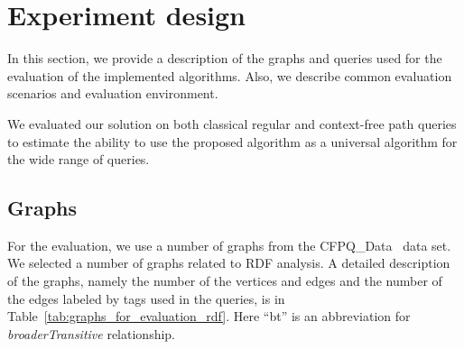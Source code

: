 \documentclass[
11pt,%
tightenlines,%
twoside,%
onecolumn,%
nobibnotes,%
nofootinbib,%
superscriptaddress,%
noshowpacs,%
longbibliography,%
centertags]%
{revtex4-2}
\begin{document}




\section{Experiment design}\label{section:dataset}
In this section, we provide a description of the graphs and queries used for the evaluation of the implemented algorithms. Also, we describe common evaluation scenarios and evaluation environment.

We evaluated our solution on both classical regular and context-free path queries to estimate the ability to use the proposed algorithm as a universal algorithm for the wide range of queries. 

\subsection{Graphs}

For the evaluation, we use a number of graphs from the CFPQ\_Data~\cite{cfpq-data} data set. We selected a number of graphs related to RDF analysis.
A detailed description of the graphs, namely the number of the vertices and edges and the number of the edges labeled by tags used in the queries, is in Table~\ref{tab:graphs_for_evaluation_rdf}. Here ``bt'' is an abbreviation for \textit{broaderTransitive} relationship.

\end{document}

